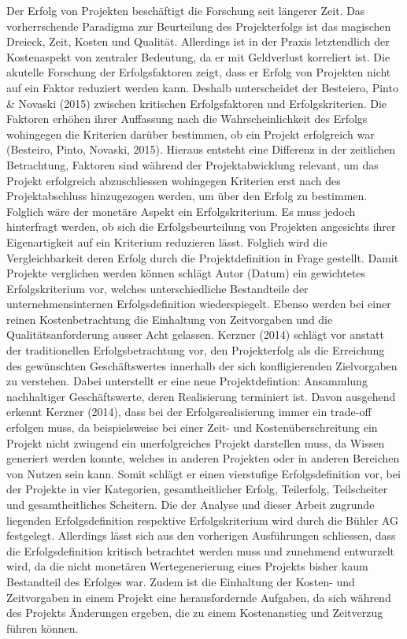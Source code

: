 \documentclass[11pt]{article}
\begin{document}
\newline
Der Erfolg von Projekten beschäftigt die Forschung seit längerer Zeit. Das vorherrschende Paradigma zur Beurteilung des Projekterfolgs ist das magischen Dreieck, Zeit, Kosten und Qualität. Allerdings ist in der Praxis letztendlich der Kostenaspekt von zentraler Bedeutung, da er mit Geldverlust korreliert ist. Die akutelle Forschung der Erfolgsfaktoren zeigt, dass er Erfolg von Projekten nicht auf ein Faktor reduziert werden kann. Deshalb unterscheidet der Besteiero, Pinto \& Novaski (2015) zwischen kritischen Erfolgsfaktoren und Erfolgskriterien. Die Faktoren erhöhen ihrer Auffassung nach die Wahrscheinlichkeit des Erfolgs wohingegen die Kriterien darüber bestimmen, ob ein Projekt erfolgreich war (Besteiro, Pinto, Novaski, 2015). Hieraus entsteht eine Differenz in der zeitlichen Betrachtung, Faktoren sind während der Projektabwicklung relevant, um das Projekt erfolgreich abzuschliessen wohingegen Kriterien erst nach des Projektabschluss hinzugezogen werden, um über den Erfolg zu bestimmen. Folglich wäre der monetäre Aspekt ein Erfolgskriterium. Es muss jedoch hinterfragt werden, ob sich die Erfolgsbeurteilung von Projekten angesichts ihrer Eigenartigkeit auf ein Kriterium reduzieren lässt. Folglich wird die Vergleichbarkeit deren Erfolg durch die Projektdefinition in Frage gestellt. Damit Projekte verglichen werden können schlägt Autor (Datum) ein gewichtetes Erfolgskriterium vor, welches unterschiedliche Bestandteile der unternehmensinternen Erfolgsdefinition wiederspiegelt. Ebenso werden bei einer reinen Kostenbetrachtung die Einhaltung von Zeitvorgaben und die Qualitätsanforderung ausser Acht gelassen. Kerzner (2014) schlägt vor anstatt der traditionellen Erfolgsbetrachtung vor, den Projekterfolg als die Erreichung des gewünschten Geschäftswertes innerhalb der sich konfligierenden Zielvorgaben zu verstehen. Dabei  unterstellt er eine neue Projektdefintion: Ansammlung nachhaltiger Geschäftswerte, deren Realisierung terminiert ist. Davon ausgehend erkennt Kerzner (2014), dass bei der Erfolgsrealisierung immer ein trade-off erfolgen muss, da beispielsweise bei einer Zeit- und Kostenüberschreitung ein Projekt nicht zwingend ein unerfolgreiches Projekt darstellen muss, da Wissen generiert werden konnte, welches in anderen Projekten oder in anderen Bereichen von Nutzen sein kann. Somit schlägt er einen vierstufige Erfolgsdefinition vor, bei der Projekte in vier Kategorien, gesamtheitlicher Erfolg, Teilerfolg, Teilscheiter und gesamtheitliches Scheitern. Die der Analyse und dieser Arbeit zugrunde liegenden Erfolgsdefinition respektive Erfolgskriterium wird durch die Bühler AG festgelegt. Allerdings lässt sich aus den vorherigen Ausführungen schliessen, dass die Erfolgsdefinition kritisch betrachtet werden muss und zunehmend entwurzelt wird, da die nicht monetären Wertegenerierung eines Projekts bisher kaum Bestandteil des Erfolges war. Zudem ist die Einhaltung der Kosten- und Zeitvorgaben in einem Projekt eine herausfordernde Aufgaben, da sich während des Projekts Änderungen ergeben, die zu einem Kostenanstieg und Zeitverzug führen können. 
\end{document}
